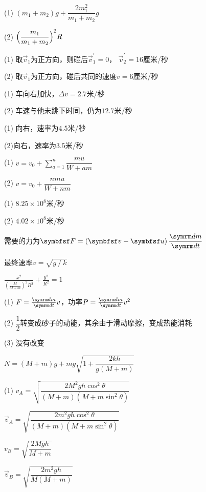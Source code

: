 \answer  (1) $ \left( m _ { 1 } + m _ { 2 } \right) g + \dfrac { 2 m _ { 1 } ^ 2 } { m _ { 1 } + m _ { 2 } } g  $\vspace{-0.5em}

(2) $ \Bigl( \dfrac { m _ { 1 } } { m _ { 1 } + m _ { 2 } } \Bigr) ^ { 2 } R   $

\answer (1) 取$ \vec{v} _ 1 $为正方向，则碰后$  \vec{v} _ { 1 } ^ { \prime } = 0   $， $ \vec{v} _ { 2 } ^ { \prime } = 1 6   $厘米/秒

(2) 取$ \vec{v} _ 1 $为正方向，碰后共同的速度$  v = 6   $厘米/秒

\answer (1) 车向右加快，$  \Delta v = 2 . 7   $米/秒

(2) 车速与他未跳下时同，仍为$ 12.7 $米/秒

\answer (1) 向右，速率为$ 4.5 $米/秒

(2)向右，速率为$ 3.5 $米/秒

\answer (1) $ v = v _ { 0 } + \sum _ { a = 1 } ^ n \dfrac { m u } { W + a m } $

(2) $ v = v _ { 0 } + \dfrac { n m u } { W + n m }  $

\answer (1) $ 8.25 \times 10 ^ 8 $米/秒

(2) $4.02\times 10 ^ 8 $米/秒

\answer 需要的力为$ \vec{F} = \left( \vec{v} - \vec{u} \right) \dfrac { \dif m } { \dif t } $

\answer 最终速率$  v = \sqrt { g \operatorname{/} k }  $

\answer $\frac{x^{2}}{\left(\frac{M}{M+m}\right)^{2} R^{2}}+\frac{y^{2}}{R^{2}}=1 $

\answer (1) $ F = \frac { \dif m } { \dif t } v   $，功率$  P = \frac { \dif m } { \dif t } v ^ { 2 }  $

(2) $ \dfrac { 1 } { 2 } $转变成砂子的动能，其余由于滑动摩擦，变成热能消耗

(3) 没有改变

\addtocounter{answer}{2}
\answer $ N = \left( M + m \right) g + m g \sqrt { 1 + \dfrac { 2 k h } { g \left( M + m \right) } }   $

\answer (1) $v_{A}=\sqrt{\dfrac{2 M^{2} g h \cos ^{2} \theta}{(M+m)\left(M+m \sin ^{2} \theta\right)}}$

\aindent $\vec{v}_{A}=\sqrt{\dfrac{2 m^{2} g h \cos ^{2} \theta}{(M+m)\left(M+m \sin ^{2} \theta\right)}}$

\aindent $v_{B}=\sqrt{\dfrac{2 M g h}{M+m}}$

\aindent $\vec{v}_{B}=\sqrt{\dfrac{2 m^{2} g h}{M(M+m)}}$

